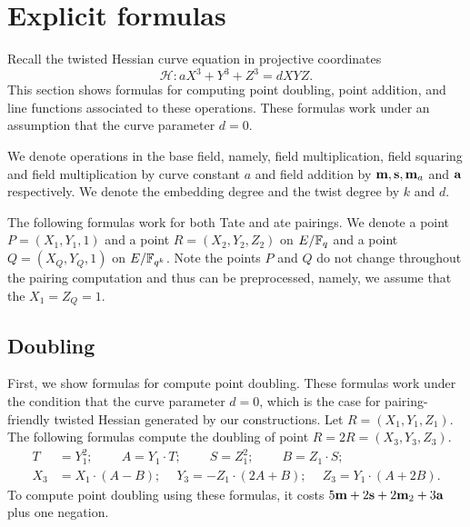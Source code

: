 \section{Explicit formulas}
\label{sec:formulas}

Recall the twisted Hessian curve equation in projective coordinates
$$ \mathcal{H}: a X^3 + Y^3 + Z^3 = d X Y Z. $$
This section shows formulas for computing point doubling, point addition,
and line functions associated to these operations.
These formulas work under an assumption that the curve parameter $d = 0$.

We denote operations in the base field, namely, 
field multiplication, field squaring and field multiplication by curve constant $a$ and field addition
by $\textbf{m}, \textbf{s}, \textbf{m}_{a}$ and $\textbf{a}$ respectively.
We denote the embedding degree and the twist degree by $k$ and $d$.

The following formulas work for both Tate and ate pairings.
We denote a point $P = (X_1,Y_1,1)$ and a point $R = (X_2,Y_2,Z_2)$ on $E/\mathbb{F}_{q}$
and a point $Q = (X_Q,Y_Q,1)$ on $E/\mathbb{F}_{q^{k}}$.
Note the points $P$ and $Q$ do not change throughout the pairing computation and thus can be preprocessed,
namely, we assume that the $X_1 = Z_Q = 1$.



\subsection{Doubling}
First, we show formulas for compute point doubling.
These formulas work under the condition that the curve parameter $d=0$,
which is the case for pairing-friendly twisted Hessian generated by our constructions.
Let $R = (X_1, Y_1, Z_1)$.
The following formulas compute the doubling of point $R = 2R = (X_3,Y_3,Z_3)$.
\begin{align*}
T &= Y_1^2;\	\qquad	A = Y_1 \cdot T;\	\qquad
S = Z_1 ^ 2;\	\qquad	B = Z_1 \cdot S;\\
X_3 &= X_1 \cdot (A - B);\	\quad
Y_3 = -Z_1 \cdot (2A + B);\	\quad
Z_3 = Y_1 \cdot (A + 2B).
\end{align*}
To compute point doubling using these formulas,
it costs $5\textbf{m} + 2\textbf{s} + 2\textbf{m}_{2} + 3\textbf{a}$ plus one negation.


